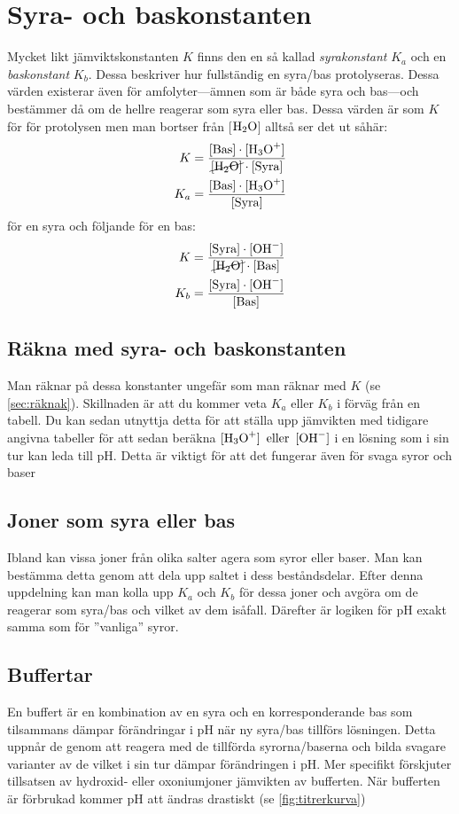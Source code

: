 \section{Syra- och baskonstanten}
Mycket likt jämviktskonstanten $K$ finns den en så kallad \emph{syrakonstant} $K_a$ och en \emph{baskonstant} $K_b$. Dessa beskriver hur fullständig en syra/bas protolyseras. Dessa värden existerar även för amfolyter---ämnen som är både syra och bas---och bestämmer då om de hellre reagerar som syra eller bas. Dessa värden är som $K$ för för protolysen men man bortser från [$\ce{H2O}$] alltså ser det ut såhär:
\begin{align*}
    K &= \frac{\mathrm{[Bas]} \cdot [\ce{H3O+}]}{\cancel{\ce{[H2O]}} \cdot \mathrm{[Syra]}} \\
    K_a &= \frac{\mathrm{[Bas]} \cdot [\ce{H3O+}]}{\mathrm{[Syra]}} 
\end{align*}
för en syra och följande för en bas:\begin{align*}
    K &= \frac{\mathrm{[Syra]} \cdot [\ce{OH^-}]}{\cancel{\ce{[H2O]}} \cdot \mathrm{[Bas]}} \\
    K_b&= \frac{\mathrm{[Syra]} \cdot [\ce{OH^-}]}{\mathrm{[Bas]}} 
\end{align*}

\subsection{Räkna med syra- och baskonstanten}
Man räknar på dessa konstanter ungefär som man räknar med $K$ (se \vref{sec:räknak}). Skillnaden är att du kommer veta $K_a \text{ eller } K_b$ i förväg från en tabell. Du kan sedan utnyttja detta för att ställa upp jämvikten med tidigare angivna tabeller för att sedan beräkna $\ce{[H3O+] \text{ eller } [OH^-]}$ i en lösning som i sin tur kan leda till pH. Detta är viktigt för att det fungerar även för svaga syror och baser

\subsection{Joner som syra eller bas}
Ibland kan vissa joner från olika salter agera som syror eller baser. Man kan bestämma detta genom att dela upp saltet i dess beståndsdelar. Efter denna uppdelning kan man kolla upp $K_a$ och $K_b$ för dessa joner och avgöra om de reagerar som syra/bas och vilket av dem isåfall. Därefter är logiken för pH exakt samma som för ''vanliga'' syror.

\subsection{Buffertar}
\label{sec:buffertar}
En buffert är en kombination av en syra och en korresponderande bas som tilsammans dämpar förändringar i pH när ny syra/bas tillförs lösningen. Detta uppnår de genom att reagera med de tillförda syrorna/baserna och bilda svagare varianter av de vilket i sin tur dämpar förändringen i pH. Mer specifikt förskjuter tillsatsen av hydroxid- eller oxoniumjoner jämvikten av bufferten. När bufferten är förbrukad kommer pH att ändras drastiskt (se \vref{fig:titrerkurva}) 

